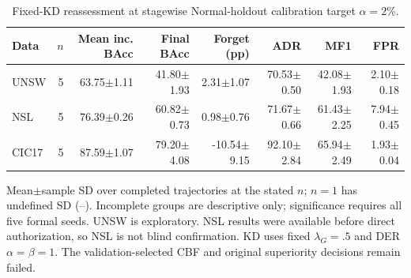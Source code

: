 \begin{table}[t]
\centering\scriptsize
\setlength{\tabcolsep}{3.3pt}
\caption{Fixed-KD reassessment at stagewise Normal-holdout calibration target $\alpha=2\%$.}\label{tab:section299-kd}
\begin{tabular}{lrrrrrrr}
\toprule
Data & $n$ & Mean inc. BAcc & Final BAcc & Forget (pp) & ADR & MF1 & FPR \\
\midrule
UNSW & 5 & 63.75$\pm$1.11 & 41.80$\pm$1.93 & 2.31$\pm$1.07 & 70.53$\pm$0.50 & 42.08$\pm$1.93 & 2.10$\pm$0.18 \\
NSL & 5 & 76.39$\pm$0.26 & 60.82$\pm$0.73 & 0.98$\pm$0.76 & 71.67$\pm$0.66 & 61.43$\pm$2.25 & 7.94$\pm$0.45 \\
CIC17 & 5 & 87.59$\pm$1.07 & 79.20$\pm$4.08 & -10.54$\pm$9.15 & 92.10$\pm$2.84 & 65.94$\pm$2.49 & 1.93$\pm$0.04 \\
\bottomrule
\end{tabular}
\par\smallskip\begin{minipage}{0.98\textwidth}\scriptsize Mean$\pm$sample SD over completed trajectories at the stated $n$; $n=1$ has undefined SD (--). Incomplete groups are descriptive only; significance requires all five formal seeds. UNSW is exploratory. NSL results were available before direct authorization, so NSL is not blind confirmation. KD uses fixed $\lambda_G=.5$ and DER $\alpha=\beta=1$. The validation-selected CBF and original superiority decisions remain failed.\end{minipage}
\end{table}

